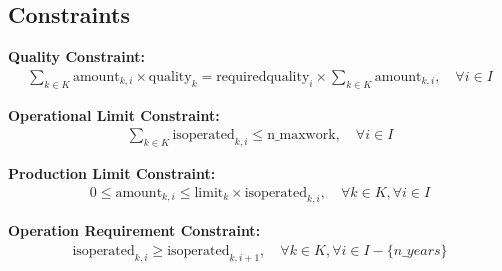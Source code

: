 \documentclass{article}
\begin{document}
\subsection*{Constraints}
\noindent \textbf{Quality Constraint:}
\begin{align*}
\sum_{k \in K} \text{amount}_{k,i} \times \text{quality}_k = \text{requiredquality}_i \times \sum_{k \in K} \text{amount}_{k,i}, \quad \forall i \in I
\end{align*}

\noindent \textbf{Operational Limit Constraint:}
\begin{align*}
\sum_{k \in K} \text{isoperated}_{k,i} \leq \text{n\_maxwork}, \quad \forall i \in I
\end{align*}

\noindent \textbf{Production Limit Constraint:}
\begin{align*}
0 \leq \text{amount}_{k,i} \leq \text{limit}_k \times \text{isoperated}_{k,i}, \quad \forall k \in K, \forall i \in I
\end{align*}

\noindent \textbf{Operation Requirement Constraint:}
\begin{align*}
\text{isoperated}_{k,i} \geq \text{isoperated}_{k,i+1}, \quad \forall k \in K, \forall i \in I - \{n\_years\}
\end{align*}
\end{document}
